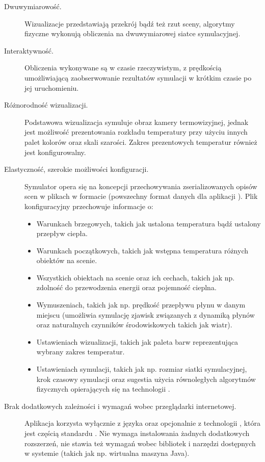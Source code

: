 \begin{description}

\item[Dwuwymiarowość.] Wizualizacje przedstawiają przekrój bądź też rzut sceny,
algorytmy fizyczne wykonują obliczenia na dwuwymiarowej siatce symulacyjnej.

\item[Interaktywność.] Obliczenia wykonywane są w czasie rzeczywistym,
z prędkością umożliwiającą zaobserwowanie rezultatów symulacji w krótkim
czasie po jej uruchomieniu.  

\item[Różnorodność wizualizacji.] Podstawowa wizualizacja symuluje obraz
kamery termowizyjnej, jednak jest możliwość prezentowania rozkładu temperatury
przy użyciu innych palet kolorów oraz skali szarości. Zakres prezentowych
temperatur również jest konfigurowalny.

\item[Elastyczność, szerokie możliwości konfiguracji.] Symulator opera się na
koncepcji przechowywania zserializowanych opisów scen w plikach w formacie
 (powszechny format danych dla aplikacji \js). Plik konfiguracyjny
przechowuje informacje o:
\begin{itemize}

\item Warunkach brzegowych, takich jak ustalona temperatura bądź ustalony
przepływ ciepła.

\item Warunkach początkowych, takich jak wstępna temperatura różnych obiektów
na scenie.

\item Wszystkich obiektach na scenie oraz ich cechach, takich jak np. zdolność
do przewodzenia energii oraz pojemność cieplna.

\item Wymuszeniach, takich jak np. prędkość przepływu płynu w danym miejscu
(umożliwia symulację zjawisk związanych z dynamiką płynów oraz naturalnych
czynników środowiskowych takich jak wiatr).

\item Ustawieniach wizualizacji, takich jak paleta barw reprezentująca
wybrany zakres temperatur.

\item Ustawieniach symulacji, takich jak np. rozmiar siatki symulacyjnej, krok
czasowy symulacji oraz sugestia użycia równoległych algorytmów fizycznych
opierających się na technologii .

\end{itemize} 

\item[Brak dodatkowych zależności i wymagań wobec przeglądarki internetowej.]
Aplikacja korzysta wyłącznie z języka \js oraz opcjonalnie z technologii
, która jest częścią standardu . Nie wymaga instalowania
żadnych dodatkowych rozszerzeń, nie stawia też wymagań wobec bibliotek i
narzędzi dostępnych w systemie (takich jak np. wirtualna maszyna Java).

\end{description}


